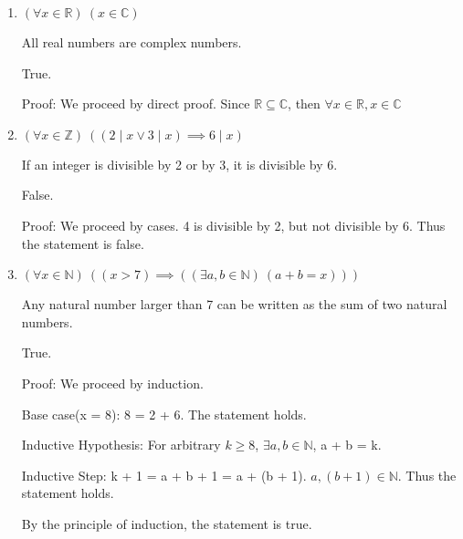 \documentclass{article}\usepackage{amsmath,amssymb,amsthm,tikz,tkz-graph,color,chngpage,soul,hyperref,csquotes,graphicx,floatrow, yfonts}\newcommand*{\QEDB}{\hfill\ensuremath{\square}}\newtheorem*{prop}{Proposition}\renewcommand{\theenumi}{\alph{enumi}}\usepackage[shortlabels]{enumitem}\usepackage[nobreak=true, framemethod=tikz]{mdframed}\usetikzlibrary{matrix,calc, automata, positioning}\MakeOuterQuote{"}\usepackage[margin=1in]{geometry} \newtheorem{theorem}{Theorem}
\begin{document}
\begin{enumerate}
  \item $(\forall x \in \mathbb{R})\ (x \in \mathbb{C})$
  \begin{mdframed}
  All real numbers are complex numbers. \par
  True. \par
  Proof: We proceed by direct proof. Since $\mathbb{R} \subseteq \mathbb{C}$, then $\forall x \in \mathbb{R}, x \in \mathbb{C}$
  \end{mdframed}

  \item $(\forall x \in \mathbb{Z})\ ((2 \mid x \lor 3 \mid x) \implies 6 \mid x)$
  \begin{mdframed}
  If an integer is divisible by 2 or by 3, it is divisible by 6. \par
  False. \par
  Proof: We proceed by cases. 4 is divisible by 2, but not divisible by 6. Thus the statement is false.
  \end{mdframed}

  \item $(\forall x \in \mathbb{N})\ ((x > 7) \implies ((\exists a, b \in \mathbb{N})\ (a + b = x)))$
  \begin{mdframed}
   Any natural number larger than 7 can be written as the sum of two natural numbers. \par
   True. \par
   Proof: We proceed by induction. \par
   Base case(x = 8): 8 = 2 + 6. The statement holds. \par
   Inductive Hypothesis: For arbitrary $k \geq 8$, $\exists a, b \in \mathbb{N}$, a + b = k. \par
   Inductive Step: k + 1 = a + b + 1 = a + (b + 1). $a, (b + 1) \in \mathbb{N}$. Thus the statement holds. \par
   By the principle of induction, the statement is true.
  \end{mdframed}

\end{enumerate}

\pagebreak
\end{document}
